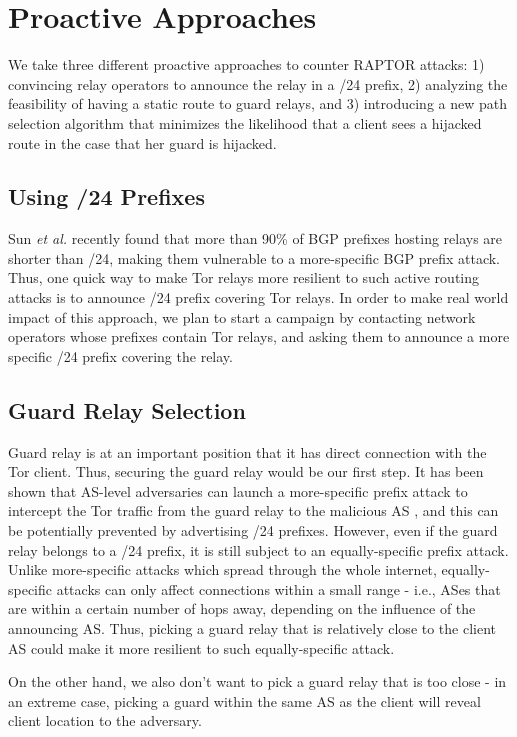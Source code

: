 \section{Proactive Approaches}
We take three different proactive approaches to counter RAPTOR attacks: 1) convincing relay operators to announce the relay in a /24 prefix, 2) analyzing the feasibility of having a static route to guard relays, and 3) introducing a new path selection algorithm that minimizes the likelihood that a client sees a hijacked route in the case that her guard is hijacked.

\subsection{Using /24 Prefixes}

Sun \emph{et al.} \cite{sun2015raptor} recently found that more than 90\% of BGP prefixes hosting relays are
shorter than /24, making them vulnerable to a more-specific BGP prefix attack. Thus, one quick way to make Tor relays more resilient to such active routing attacks is to announce /24 prefix covering Tor relays. In order to make real world impact of this approach, we plan to start a campaign by contacting network operators whose prefixes contain Tor relays, and asking them to announce a more specific /24 prefix covering the relay. 

\subsection{Guard Relay Selection}

Guard relay is at an important position that it has direct connection with the Tor client. Thus, securing the guard relay would be our first step. It has been shown that AS-level adversaries can launch a more-specific prefix attack to intercept the Tor traffic from the guard relay to the malicious AS \cite{sun2015raptor}, and this can be potentially prevented by advertising /24 prefixes. However, even if the guard relay belongs to a /24 prefix, it is still subject to an equally-specific prefix attack. Unlike more-specific attacks which spread through the whole internet, equally-specific attacks can only affect connections within a small range - i.e., ASes that are within a certain number of hops away, depending on the influence of the announcing AS. Thus, picking a guard relay that is relatively close to the client AS could make it more resilient to such equally-specific attack.

On the other hand, we also don't want to pick a guard relay that is too close - in an extreme case, picking a guard within the same AS as the client will reveal client location to the adversary. 

